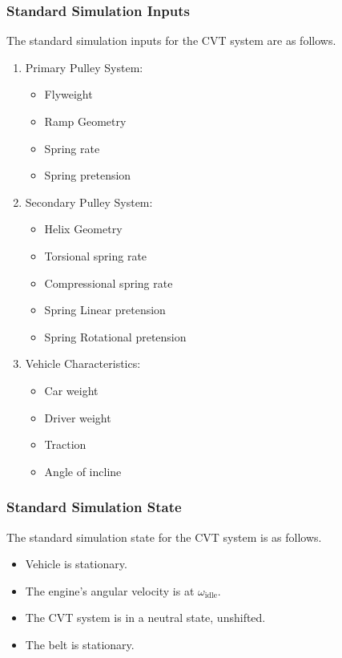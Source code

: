\documentclass[12pt, titlepage]{article}
\begin{document}
\subsubsection*{Standard Simulation Inputs}
\label{sec:standard_inputs}
The standard simulation inputs for the CVT system are as follows.
\begin{enumerate}
  \item Primary Pulley System:
  \begin{itemize}
    \item Flyweight
    \item Ramp Geometry
    \item Spring rate
    \item Spring pretension
  \end{itemize}
  \item Secondary Pulley System:
  \begin{itemize}
    \item Helix Geometry
    \item Torsional spring rate
    \item Compressional spring rate
    \item Spring Linear pretension
    \item Spring Rotational pretension
  \end{itemize}
  \item Vehicle Characteristics:
  \begin{itemize}
    \item Car weight
    \item Driver weight
    \item Traction
    \item Angle of incline
  \end{itemize}
\end{enumerate}

\subsubsection*{Standard Simulation State}
\label{sec:standard_state}
The standard simulation state for the CVT system is as follows.
\begin{itemize}
  \item Vehicle is stationary.
  \item The engine's angular velocity is at $\omega_\text{idle}$.
  \item The CVT system is in a neutral state, unshifted.
  \item The belt is stationary.
\end{itemize}
\end{document}
